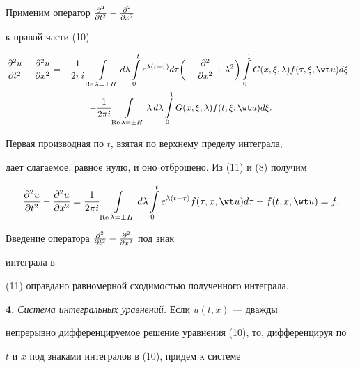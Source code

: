 


\begin{pf} 


Применим оператор $\frac{\partial ^2}{\partial t^2}-\frac{\partial ^2}{\partial x^2}$ 


к правой части (10) 


\begin{multline} 


\myfrac{^2u}{t^2}-\myfrac{^2u}{x^2}=-\frac{1}{2\pi i} 


\intl_{\re\lambda=\pm H}d\lambda\intl^t_0 


e^{\lambda(t-\tau)}d\tau\bigg(-\myfrac{^2}{x^2}+\lambda^2\bigg) 


\intl^1_0 G(x,\xi,\lambda)f(\tau,\xi,\wt u)d\xi-\\


-\frac{1}{2\pi i} 


\intl_{\re\lambda=\pm H}\lambda\,d\lambda\intl^1_0 


G(x,\xi,\lambda)f(t,\xi,\wt u)d\xi. 


\end{multline} 


Первая производная по $t$, взятая по верхнему пределу интеграла, 


дает слагаемое, равное нулю, и оно отброшено. Из (11) и (8) получим 


$$ 


\myfrac{^2u}{t^2}-\myfrac{^2u}{x^2}=\frac{1}{2\pi i} 


\intl_{\re\lambda=\pm H}d\lambda\intl^t_0 


e^{\lambda(t-\tau)}f(\tau,x,\wt u)d\tau+f(t,x,\wt u)=f. 


$$ 


Введение оператора $\frac{\partial ^2}{\partial t^2}-\frac{\partial ^2}{\partial x^2}$ под знак 


интеграла в 


(11) оправдано равномерной сходимостью полученного интеграла. 


\end{pf} 


 


{\bf 4.} {\it Система интегральных уравнений.} Если $u(t,x)$ --- дважды 


непрерывно дифференцируемое решение уравнения (10), то, дифференцируя по 


$t$ и $x$ под знаками интегралов в (10), придем к системе 



